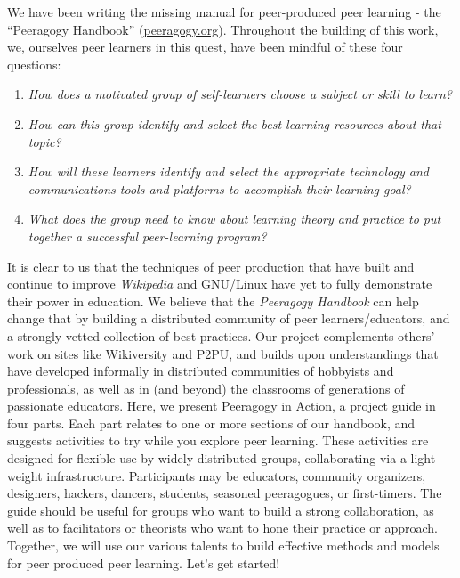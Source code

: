 We have been writing the missing manual for peer-produced peer learning
- the ``Peeragogy Handbook''
(\href{http://peeragogy.org/}{peeragogy.org}). Throughout the building
of this work, we, ourselves peer learners in this quest, have been
mindful of these four questions:

\begin{enumerate}
\item
  \emph{How does a motivated group of self-learners choose a subject or
  skill to learn?}
\item
  \emph{How can this group identify and select the best learning
  resources about that topic?}
\item
  \emph{How will these learners identify and select the appropriate
  technology and communications tools and platforms to accomplish their
  learning goal?}
\item
  \emph{What does the group need to know about learning theory and
  practice to put together a successful peer-learning program?}
\end{enumerate}
It is clear to us that the techniques of peer production that have built
and continue to improve \emph{Wikipedia} and GNU/Linux have yet to fully
demonstrate their power in education. We believe that the
\emph{Peeragogy Handbook} can help change that by building a distributed
community of peer learners/educators, and a strongly vetted collection
of best practices. Our project complements others' work on sites like
Wikiversity and P2PU, and builds upon understandings that have developed
informally in distributed communities of hobbyists and professionals, as
well as in (and beyond) the classrooms of generations of passionate
educators. Here, we present Peeragogy in Action, a project guide in four
parts. Each part relates to one or more sections of our handbook, and
suggests activities to try while you explore peer learning. These
activities are designed for flexible use by widely distributed groups,
collaborating via a light-weight infrastructure. Participants may be
educators, community organizers, designers, hackers, dancers, students,
seasoned peeragogues, or first-timers. The guide should be useful for
groups who want to build a strong collaboration, as well as to
facilitators or theorists who want to hone their practice or approach.
Together, we will use our various talents to build effective methods and
models for peer produced peer learning. Let's get started!

